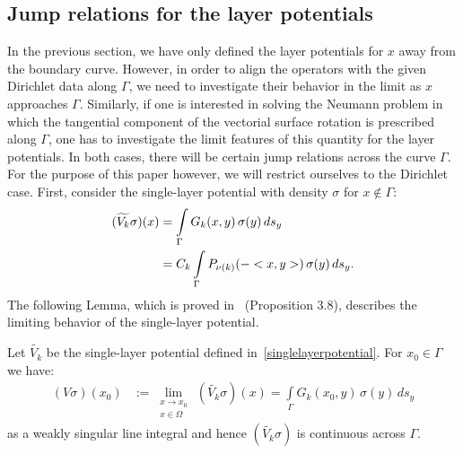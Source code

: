 \subsection{Jump relations for the layer potentials} 
In the previous section, we have only defined the layer potentials for
$x$ away from the boundary curve. However, in order to align the
operators with the given Dirichlet data along $\Gamma$, we need to
investigate their behavior in the limit as $x$ approaches $\Gamma$.
Similarly, if one is interested in solving the Neumann problem in which
the tangential component of the vectorial surface rotation is prescribed
along $\Gamma$, one has to investigate the limit features of this
quantity for the layer potentials. In both cases, there will be certain
jump relations across the curve $\Gamma$. For the purpose of this paper
however, we will restrict ourselves to the Dirichlet case.  First,
consider the single-layer potential with density $\sigma$ for $x \notin
\Gamma$:
\begin{align*}
  (\widetilde{V_k}\sigma)(x) & =  \int\limits_\Gamma
  G_k(x,y)\,\sigma(y)\,ds_{y} \\
  & = C_k \int\limits_\Gamma P_{\nu(k)}(-<x,y>)\,\sigma(y)\,ds_{y}.
\end{align*}
The following Lemma, which is proved in~\cite{mit:tay1999} (Proposition
3.8), describes the limiting behavior of the single-layer potential.
\begin{lemma}
Let $\widetilde{V_k}$ be the single-layer potential defined
in~\eqref{singlelayerpotential}. For $x_{0}\in\Gamma$ we have:
\begin{align*} 
  (V\sigma)(x_0) & := \lim\limits_{\substack{
      x \to x_{0} \\ x \in \Omega}}
  \,(\widetilde{V_k}\sigma)(x) = \int\limits_\Gamma G_k(x_{0},y)\,\sigma(y)\,ds_{y}
\end{align*}
as a weakly singular line integral and hence $(\widetilde{V_k}\sigma)$
is continuous across $\Gamma$.
\end{lemma}

